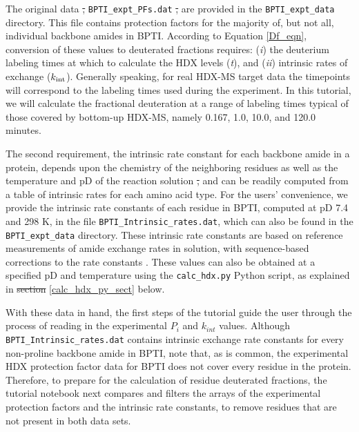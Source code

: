 \documentclass[9pt,tutorial]{livecoms}
\providecommand{\DIFadd}[1]{{\protect\color{blue}\uwave{#1}}} %
\providecommand{\DIFdel}[1]{{\protect\color{red}\sout{#1}}}                      %
\providecommand{\DIFaddbegin}{} %
\providecommand{\DIFaddend}{} %
\providecommand{\DIFdelbegin}{} %
\providecommand{\DIFdelend}{} %
\begin{document}
The original data \DIFdelbegin \DIFdel{, }\DIFdelend \DIFaddbegin \DIFadd{listed in }\DIFaddend \texttt{BPTI\_expt\_PFs.dat} \DIFdelbegin \DIFdel{, }\DIFdelend are provided in the \texttt{BPTI\_expt\_data} directory.
This file contains protection factors for the majority of, but not all, individual backbone amides in BPTI.
According to Equation \ref{Df_eqn}, conversion of these values to deuterated fractions requires: (\textit{i}) the deuterium labeling times at which to calculate the HDX levels (\textit{t}), and (\textit{ii}) intrinsic rates of exchange ($k_\textnormal{int}$).
Generally speaking, for real HDX-MS target data the timepoints will correspond to the labeling times used during the experiment.
In this tutorial, we will calculate the fractional deuteration at a range of labeling times typical of those covered by bottom-up HDX-MS, namely 0.167, 1.0, 10.0, and 120.0 minutes. 

The second requirement, the intrinsic rate constant for each backbone amide in a protein, depends upon the chemistry of the neighboring residues as well as the temperature and pD of the reaction solution \DIFdelbegin \DIFdel{, }\DIFdelend and can be readily computed from a table of intrinsic rates for each amino acid type.
For the users' convenience, we provide the intrinsic rate constants of each residue in BPTI, computed at pD 7.4 and 298 K, in the file \texttt{BPTI\_Intrinsic\_rates.dat}, which can also be found in the \texttt{BPTI\_expt\_data} directory.
These intrinsic rate constants are based on reference measurements of amide exchange rates in solution, with sequence-based corrections to the rate constants \cite{Bai1993, Nguyen2018}.
These values can also be obtained at a specified pD and temperature using the \texttt{calc\_hdx.py} Python script, as explained in \DIFdelbegin \DIFdel{section }\DIFdelend \DIFaddbegin \DIFadd{Section }\DIFaddend \ref{calc_hdx_py_sect} below.

With these data in hand, the first steps of the tutorial guide the user through the process of reading in the experimental $P_i$ and $k_{int}$ values. 
Although \texttt{BPTI\_Intrinsic\_rates.dat} contains intrinsic exchange rate constants for every non-proline backbone amide in BPTI, note that, as is common, the experimental HDX protection factor data for BPTI does not cover every residue in the protein. 
Therefore, to prepare for the calculation of residue deuterated fractions, the tutorial notebook next compares and filters the arrays of the experimental protection factors and the intrinsic rate constants, to remove residues that are not present in both data sets.
\end{document}
